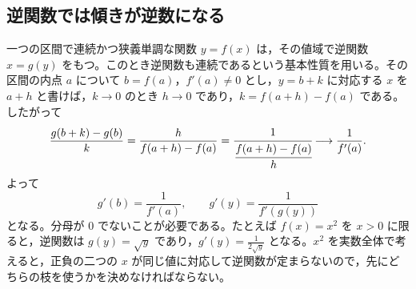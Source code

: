 \subsection{逆関数では傾きが逆数になる}
一つの区間で連続かつ狭義単調な関数 $y=f(x)$ は，その値域で逆関数 $x=g(y)$ をもつ。このとき逆関数も連続であるという基本性質を用いる。その区間の内点 $a$ について $b=f(a)$，$f'(a)\ne0$ とし，$y=b+k$ に対応する $x$ を $a+h$ と書けば，$k\to0$ のとき $h\to0$ であり，$k=f(a+h)-f(a)$ である。したがって
\[
 \frac{g(b+k)-g(b)}k
 =\frac{h}{f(a+h)-f(a)}
 =\cfrac{1}{\cfrac{f(a+h)-f(a)}h}
 \longrightarrow\frac1{f'(a)}.
\]
よって
\[
 g'(b)=\frac1{f'(a)},\qquad
 g'(y)=\frac1{f'(g(y))}
\]
となる。分母が $0$ でないことが必要である。たとえば $f(x)=x^2$ を $x>0$ に限ると，逆関数は $g(y)=\sqrt y$ であり，$g'(y)=\frac1{2\sqrt y}$ となる。$x^2$ を実数全体で考えると，正負の二つの $x$ が同じ値に対応して逆関数が定まらないので，先にどちらの枝を使うかを決めなければならない。

